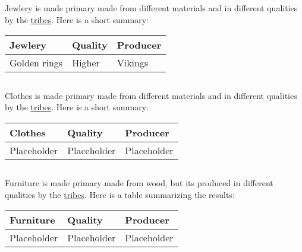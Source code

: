\Gls{Jewlery} is made primary made from different materials and in different qualities by the
\hyperref[ch:Tribes]{tribes}. Here is a short summary:

\begin{longtable}{lll}
	\toprule
	\Gls*{Jewlery} & Quality & Producer      \\
	\midrule
	Golden rings   & Higher  & \Gls{Vikings} \\ \bottomrule
\end{longtable}

\subsection{}\label{ch:Goods:Merchandise:Clothes}

\Gls{Clothes} is made primary made from different materials and in different qualities by the
\hyperref[ch:Tribes]{tribes}. Here is a short summary:

\begin{longtable}{lll}
	\toprule
	\Gls*{Clothes} & Quality     & Producer    \\
	\midrule
	Placeholder    & Placeholder & Placeholder \\
	\bottomrule
\end{longtable}

\subsection{}\label{ch:Goods:Merchandise:Furniture}

\Gls{Furniture} is made primary made from wood, but its produced in different qualities by the
\hyperref[ch:Tribes]{tribes}. Here is a table summarizing the results:

\begin{longtable}{lll}
	\toprule
	\Gls{Furniture} & Quality     & Producer    \\
	\midrule
	Placeholder     & Placeholder & Placeholder \\
	\bottomrule
\end{longtable}
